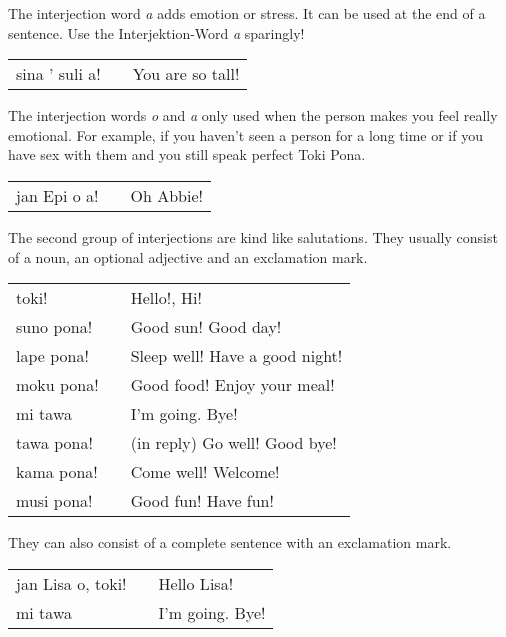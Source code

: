 The interjection word \textit{a} adds emotion or stress.
It can be used at the end of a sentence.
Use the Interjektion-Word \textit{a} sparingly!

\begin{supertabular}{p{5,5cm}|ll}
    sina ' suli a! &  & You are so tall! \\
\end{supertabular}

The interjection words \textit{o} and \textit{a} only used when the person makes you feel really emotional.
For example, if you haven't seen a person for a long time or if you have sex with them and you still speak perfect Toki Pona.

\begin{supertabular}{p{5,5cm}|ll}
    jan Epi o a! &  & Oh Abbie! \\
\end{supertabular}

%
The second group of interjections are kind like salutations.
They usually consist of a noun, an optional adjective and an exclamation mark.

\begin{supertabular}{p{5,5cm}|ll}
    toki!      &  & Hello!, Hi!                    \\
    suno pona! &  & Good sun! Good day!            \\
    lape pona! &  & Sleep well! Have a good night! \\
    moku pona! &  & Good food! Enjoy your meal!    \\
    mi tawa    &  & I'm going. Bye!                \\
    tawa pona! &  & (in reply) Go well! Good bye!  \\
    kama pona! &  & Come well! Welcome!            \\
    musi pona! &  & Good fun! Have fun!            \\
\end{supertabular}

They can also consist of a complete sentence with an exclamation mark.

\begin{supertabular}{p{5,5cm}|ll}
    jan Lisa o, toki! &  & Hello Lisa!     \\
    mi tawa           &  & I'm going. Bye! \\
\end{supertabular}
%
\newpage
